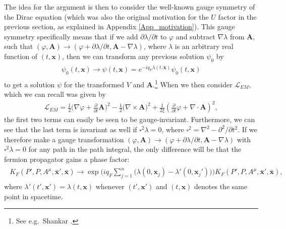 \documentclass{article}
\begin{document}
The idea for the argument is then to consider the well-known gauge symmetry of the Dirac equation (which was also the original motivation for the $U$ factor in the previous section, as explained in Appendix \ref{App_motivation}). 
This gauge symmetry specifically means that if we add $\partial \lambda / \partial t$ to $\varphi$ and subtract $\nabla \lambda$ from $\mathbf{A}$, such that $(\varphi, \mathbf{A}) \to (\varphi + \partial \lambda / \partial t, \mathbf{A} - \nabla \lambda)$, where $\lambda$ is an arbitrary real function of $(t, \mathbf{x})$, then we can transform any previous solution $\psi_0$ by 
\begin{align}
\begin{aligned}
	\psi_0(t, \mathbf{x}) \to \psi(t, \mathbf{x}) = 
		e^{-iq_F\lambda(t, \mathbf{x})} 
		\psi_0(t, \mathbf{x})
	\label{gauge_sym_Dirac}
\end{aligned}
\end{align}
to get a solution $\psi$ for the transformed $V$ and $\mathbf{A}$.\footnote{
	See e.g.\ Shankar \cite{Shankar}. 
}
When we then consider $\mathcal{L}_{EM}$, which we can recall was given by
\begin{align}
	\mathcal{L}_{EM} = 
		\frac{1}{2}\big(\nabla \varphi + \frac{\partial}{\partial t} \mathbf A\big)^2 - 
		\frac{1}{2}\big(\nabla \times \mathbf A\big)^2 +
		\frac{1}{2\xi} (\frac{\partial}{\partial t} \varphi + \nabla \cdot \mathbf A)^2,
	\label{Lagrangian_EM_02}
\end{align}
the first two terms can easily be seen to be gauge-invariant. Furthermore, we can see that the last term 
is invariant as well if $\square^2\lambda = 0$, where $\square^2 = \nabla^2 - \partial^2 / \partial t^2$. If we therefore make a gauge transformation $(\varphi, \mathbf{A}) \to (\varphi + \partial \lambda / \partial t, \mathbf{A} - \nabla \lambda)$ with $\square^2\lambda = 0$ for any path in the path integral, the only difference will be that the fermion propagator gains a phase factor:
\begin{align}
\begin{aligned}
	K_F(
		P', P, 
		A^\mu,
		\mathbf{\bar x}', \mathbf{\bar x}
	)
	\to
	\exp\Big(
		iq_F \sum_{j=1}^{n}\big(
			\lambda(0, \mathbf{x}_j) - 
			\lambda'(0, \mathbf{x}_j')
		\big)
	\Big)
	K_F(
		P', P, 
		A^\mu,
		\mathbf{\bar x}', \mathbf{\bar x}
	),
	\label{gauge_transform_of_K_F_formal}
\end{aligned}
\end{align}
where $\lambda'(t',\mathbf{x}') = \lambda(t, \mathbf{x})$ whenever $(t', \mathbf{x}')$ and $(t, \mathbf{x})$ denotes the same point in spacetime. 
\end{document}
